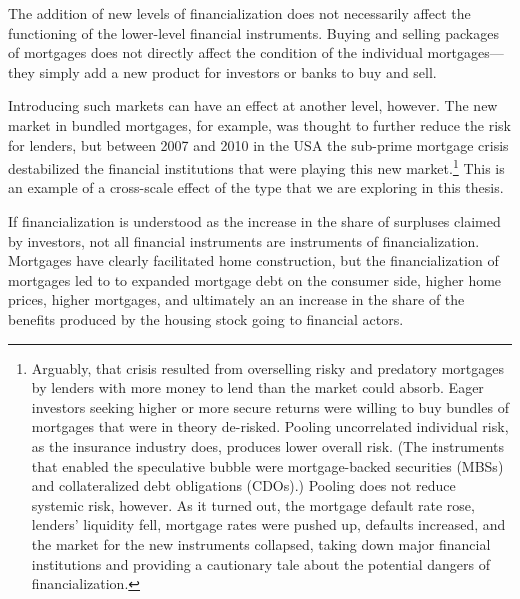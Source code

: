 The addition of new levels of financialization does not necessarily affect the functioning of the lower-level financial instruments. Buying and selling packages of mortgages does not directly affect the condition of the individual mortgages---they simply add a new product for investors or banks to buy and sell. 

Introducing such markets can have an effect at another level, however. The new market in bundled mortgages, for example, was thought to further reduce the risk for lenders, but between 2007 and 2010 in the USA the sub-prime mortgage crisis destabilized the financial institutions that were playing this new market.\footnote{Arguably, that crisis resulted from overselling risky and predatory mortgages by lenders with more money to lend than the market could absorb. Eager investors seeking higher or more secure returns were willing to buy bundles of mortgages that were in theory de-risked. Pooling uncorrelated individual risk, as the insurance industry does, produces lower overall risk. (The instruments that enabled the speculative bubble were mortgage-backed securities (MBSs) and collateralized debt obligations (CDOs).) Pooling does not reduce systemic risk, however. As it turned out, the mortgage default rate rose, lenders' liquidity fell, mortgage rates were pushed up, defaults increased, and the market for the new instruments collapsed, taking down major financial institutions and providing a cautionary tale about the potential dangers of financialization.} 
This is an example of a cross-scale effect of the type that we are exploring in this thesis.  



If financialization is understood as the increase in the share of surpluses claimed by investors, not all financial instruments are instruments of financialization. Mortgages have clearly facilitated home construction, but the financialization of mortgages led to to expanded mortgage debt on the consumer side, higher home prices, higher mortgages, and ultimately an an increase in the share of the benefits produced by the housing stock going to financial actors. 



